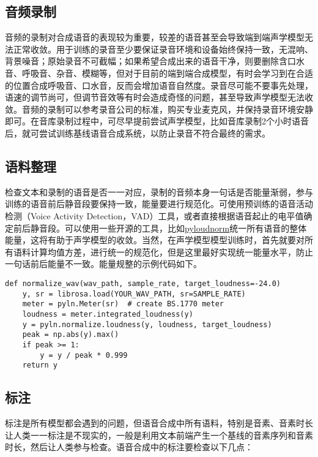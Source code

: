 \documentclass[cn,10pt,math=newtx,citestyle=gb7714-2015,bibstyle=gb7714-2015]{elegantbook}
\begin{document}
\subsection{音频录制}

音频的录制对合成语音的表现较为重要，较差的语音甚至会导致端到端声学模型无法正常收敛。用于训练的录音至少要保证录音环境和设备始终保持一致，无混响、背景噪音；原始录音不可截幅；如果希望合成出来的语音干净，则要删除含口水音、呼吸音、杂音、模糊等，但对于目前的端到端合成模型，有时会学习到在合适的位置合成呼吸音、口水音，反而会增加语音自然度。录音尽可能不要事先处理，语速的调节尚可，但调节音效等有时会造成奇怪的问题，甚至导致声学模型无法收敛。音频的录制可以参考录音公司的标准，购买专业麦克风，并保持录音环境安静即可。在音库录制过程中，可尽早提前尝试声学模型，比如音库录制2个小时语音后，就可尝试训练基线语音合成系统，以防止录音不符合最终的需求。

\subsection{语料整理}

检查文本和录制的语音是否一一对应，录制的音频本身一句话是否能量渐弱，参与训练的语音前后静音段要保持一致，能量要进行规范化。可使用预训练的语音活动检测（Voice Activity Detection，VAD）工具，或者直接根据语音起止的电平值确定前后静音段。可以使用一些开源的工具，比如\href{https://github.com/csteinmetz1/pyloudnorm}{pyloudnorm}统一所有语音的整体能量，这将有助于声学模型的收敛。当然，在声学模型模型训练时，首先就要对所有语料计算均值方差，进行统一的规范化，但是这里最好实现统一能量水平，防止一句话前后能量不一致。能量规整的示例代码如下。

\begin{lstlisting}
def normalize_wav(wav_path, sample_rate, target_loudness=-24.0)
    y, sr = librosa.load(YOUR_WAV_PATH, sr=SAMPLE_RATE)
    meter = pyln.Meter(sr)  # create BS.1770 meter
    loudness = meter.integrated_loudness(y)
    y = pyln.normalize.loudness(y, loudness, target_loudness)
    peak = np.abs(y).max()
    if peak >= 1:
        y = y / peak * 0.999
    return y
\end{lstlisting}

\subsection{标注}

标注是所有模型都会遇到的问题，但语音合成中所有语料，特别是音素、音素时长让人类一一标注是不现实的，一般是利用文本前端产生一个基线的音素序列和音素时长，然后让人类参与检查。语音合成中的标注要检查以下几点：
\end{document}
